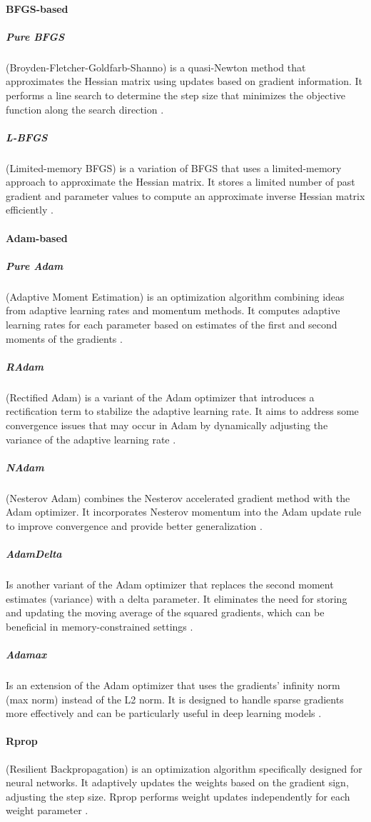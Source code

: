 \paragraph{BFGS-based}
\subparagraph{Pure BFGS}
(Broyden-Fletcher-Goldfarb-Shanno) is a quasi-Newton method that approximates the Hessian matrix using updates based on gradient information.
It performs a line search to determine the step size that minimizes the objective function along the search direction \cite{Fletcher1987}.
\subparagraph{L-BFGS}
(Limited-memory BFGS) is a variation of BFGS that uses a limited-memory approach to approximate the Hessian matrix.
It stores a limited number of past gradient and parameter values to compute an approximate inverse Hessian matrix efficiently \cite{Liu1989}.
\paragraph{Adam-based}
\subparagraph{Pure Adam}
(Adaptive Moment Estimation) is an optimization algorithm combining ideas from adaptive learning rates and momentum methods.
It computes adaptive learning rates for each parameter based on estimates of the first and second moments of the gradients \cite{Kingma2017}.
\subparagraph{RAdam}
(Rectified Adam) is a variant of the Adam optimizer that introduces a rectification term to stabilize the adaptive learning rate.
It aims to address some convergence issues that may occur in Adam by dynamically adjusting the variance of the adaptive learning rate \cite{Liu2021}.
\subparagraph{NAdam}
(Nesterov Adam) combines the Nesterov accelerated gradient method with the Adam optimizer.
It incorporates Nesterov momentum into the Adam update rule to improve convergence and provide better generalization \cite{Tato2018}.
\subparagraph{AdamDelta}
Is another variant of the Adam optimizer that replaces the second moment estimates (variance) with a delta parameter.
It eliminates the need for storing and updating the moving average of the squared gradients, which can be beneficial in memory-constrained settings \cite{Zeiler2012}.
\subparagraph{Adamax}
Is an extension of the Adam optimizer that uses the gradients' infinity norm (max norm) instead of the L2 norm. It is designed to handle sparse gradients more effectively and can be particularly useful in deep learning models \cite{Bera2020}.
\paragraph{Rprop}
(Resilient Backpropagation) is an optimization algorithm specifically designed for neural networks.
It adaptively updates the weights based on the gradient sign, adjusting the step size.
Rprop performs weight updates independently for each weight parameter \cite{Riedmiller1992}.

